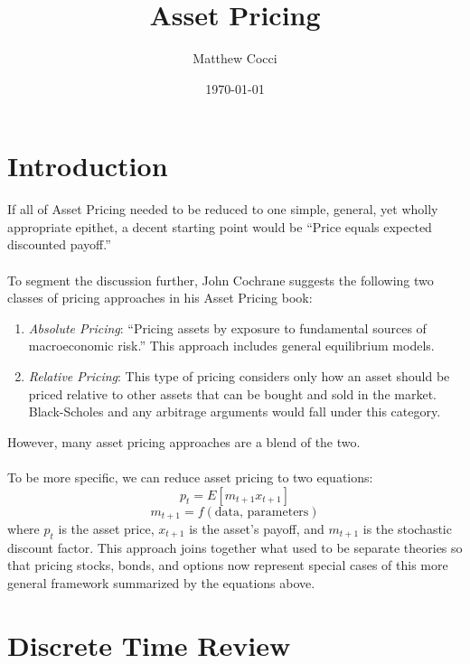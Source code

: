 \documentclass[a4paper,12pt]{scrartcl}
\author{Matthew Cocci}
\title{Asset Pricing}
\date{\today}
\begin{document}
\maketitle


\section{Introduction}

If all of Asset Pricing needed to be reduced to one simple,
general, yet wholly appropriate epithet, a decent starting
point would be ``Price equals expected discounted payoff.''
\\
\\
To segment the discussion further, John Cochrane suggests the
following two classes of pricing approaches in his 
Asset Pricing book:
\begin{enumerate}
    \item {\sl Absolute Pricing}: ``Pricing assets by exposure
	to fundamental sources of macroeconomic risk.'' This
	approach includes general equilibrium models. 
    \item {\sl Relative Pricing}: This type of pricing considers
	only how an asset should be priced relative to 
	other assets that can be bought and sold in the
	market. Black-Scholes and any arbitrage arguments
	would fall under this category.
\end{enumerate}
However, many asset pricing approaches are a blend of the two.
\\
\\
To be more specific, we can reduce asset pricing to two 
equations:
\begin{equation}
    p_t = E[m_{t+1} x_{t+1} ]
\end{equation}
\begin{equation}
    m_{t+1} = f(\text{data, parameters})
\end{equation}
where $p_t$ is the asset price, $x_{t+1}$ is the asset's payoff,
and $m_{t+1}$ is the stochastic discount factor.
This approach joins together what used to be separate theories so
that pricing stocks, bonds, and options now represent special
cases of this more general framework summarized by the equations above.

\newpage
\section{Discrete Time Review}
\end{document}
